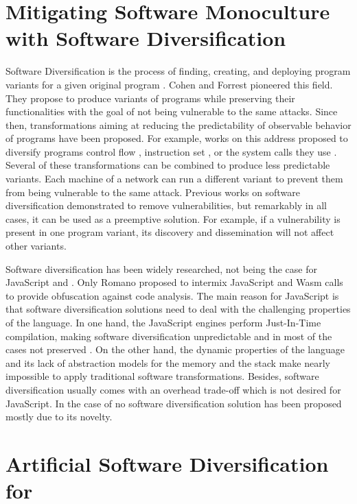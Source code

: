 \section{Mitigating Software Monoculture with Software Diversification}

Software Diversification is the process of finding, creating, and deploying program variants for a given original program \cite{okhravi2013survey}.
Cohen \etal \cite{cohen1993operating} and Forrest \etal \cite{595185} pioneered this field. 
They propose to produce variants of programs while preserving their functionalities with the goal of not being vulnerable to the same attacks.
Since then, transformations aiming at reducing the predictability of observable behavior of programs have been proposed. For example, works on this address proposed to diversify programs control flow \cite{davi2015isomeron}, instruction set \cite{barrantes2003randomized}, or the system calls they use \cite{Chew02mitigatingbuffer}. 
Several of these transformations can be combined to produce less predictable variants.
Each machine of a network can run a different variant to prevent them from being
vulnerable to the same attack.
Previous works on software diversification demonstrated to remove vulnerabilities, but remarkably in all cases, it can be used as a preemptive solution.
For example, if a vulnerability is present in one program variant, its discovery and dissemination will not affect other variants.


Software diversification has been widely researched, not being the case for JavaScript and \wasm.
Only Romano \etal \cite{wobfuscator} proposed to intermix JavaScript and Wasm calls to provide obfuscation against code analysis. 
The main reason for JavaScript is that software diversification solutions need to deal with the challenging properties of the language.
In one hand, the JavaScript engines perform Just-In-Time compilation, making software diversification unpredictable and in most of the cases not preserved \cite{STRAC}.
On the other hand, the dynamic properties of the language and its lack of abstraction models for the memory and the stack make nearly impossible to apply traditional software transformations.
Besides, software diversification usually comes with an overhead trade-off which is not desired for JavaScript. 
In the case of \wasm no software diversification solution has been proposed mostly due to its novelty.



\section{Artificial Software Diversification for \wasm}

